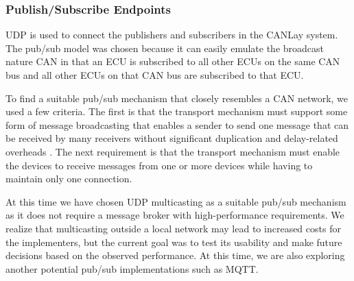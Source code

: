 \documentclass[letterpaper,twocolumn,12pt]{article}
\begin{document}

\subsubsection{Publish/Subscribe Endpoints}
UDP is used to connect the publishers and subscribers in the CANLay system. 
The pub/sub model was chosen because it can easily emulate the broadcast nature CAN \cite{kaiser_implementing_1999} in that an ECU is subscribed to all other ECUs on the same CAN bus and all other ECUs on that CAN bus are subscribed to that ECU. 

To find a suitable pub/sub mechanism that closely resembles a CAN network, we used a few criteria. The first is that the transport mechanism must support some form of message broadcasting that enables a sender to send one message that can be received by many receivers without significant duplication and delay-related overheads \cite{kaiser_implementing_1999}. The next requirement is that the transport mechanism must enable the devices to receive messages from one or more devices while having to maintain only one connection.

At this time we have chosen UDP multicasting as a suitable pub/sub mechanism as it does not require a message broker with high-performance requirements. We realize that multicasting outside a local network may lead to increased costs for the implementers, but the current goal was to test its usability and make future decisions based on the observed performance. At this time, we are also exploring another potential pub/sub implementations such as MQTT.
\end{document}

